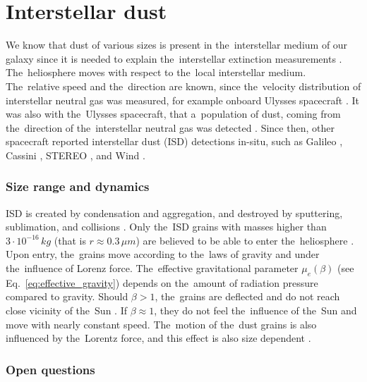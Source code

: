 \section{Interstellar dust}

We know that dust of various sizes is present in the~interstellar medium of our galaxy since it is needed to explain the~interstellar extinction measurements \citep{desert1990interstellar}. The~heliosphere moves with respect to the~local interstellar medium. The~relative speed and the~direction are known, since the~velocity distribution of interstellar neutral gas was measured, for example onboard Ulysses spacecraft \citep{witte2004kinetic}. It was also with the~Ulysses spacecraft, that a~population of dust, coming from the~direction of the~interstellar neutral gas was detected \citep{grun1993discovery}. Since then, other spacecraft reported interstellar dust ({ISD}) detections in-situ, such as Galileo \citep{baguhl1995flux}, Cassini \citep{altobelli2003cassini}, STEREO \citep{zaslavsky2012interplanetary}, and Wind \citep{malaspina2014interplanetary}. 

\subsubsection{Size range and dynamics}

ISD is created by condensation and aggregation, and destroyed by sputtering, sublimation, and collisions \citep{mann2010interstellar}. Only the~ISD grains with masses higher than $3\cdot 10^{-16} \, \si{kg}$ (that is $r \approx 0.3 \, \si{\mu m} $) are believed to be able to enter the~heliosphere \citep{kimura1998electric}. Upon entry, the~grains move according to the~laws of gravity and under the~influence of Lorenz force. The~effective gravitational parameter $\mu_e(\beta)$ (see Eq.~\ref{eq:effective_gravity}) depends on the~amount of radiation pressure compared to gravity. Should $\beta > 1$, the~grains are deflected and do not reach close vicinity of the~Sun \citep{henriksen2022interstellar}. If $\beta \approx 1$, they do not feel the~influence of the~Sun and move with nearly constant speed. The~motion of the~dust grains is also influenced by the~Lorentz force, and this effect is also size dependent \citep{morfill1979motion}.

\subsubsection{Open questions}

